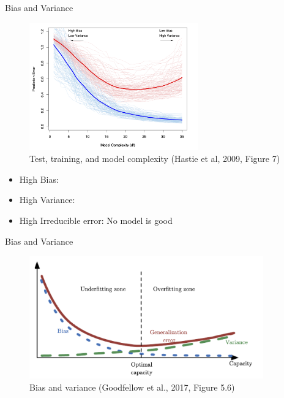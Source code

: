 \documentclass[10pt,handout]{beamer}
\begin{document}
\begin{frame}{Bias and Variance}

\begin{figure}[h]
\caption{Test, training, and model complexity (Hastie et al, 2009, Figure 7)}
\centering
\includegraphics[width=0.65\textwidth]{figs/ESL_7_1.png}
\end{figure}

\begin{itemize}
\item High Bias: 
\item High Variance: 
\item High Irreducible error: No model is good
\end{itemize}

\end{frame}


\begin{frame}{Bias and Variance}

\begin{figure}[h]
\caption{Bias and variance (Goodfellow et al., 2017, Figure 5.6)}
\centering
\includegraphics[width=0.9\textwidth]{figs/Dl_5_6.png}
\end{figure}

\end{frame}
\end{document}
